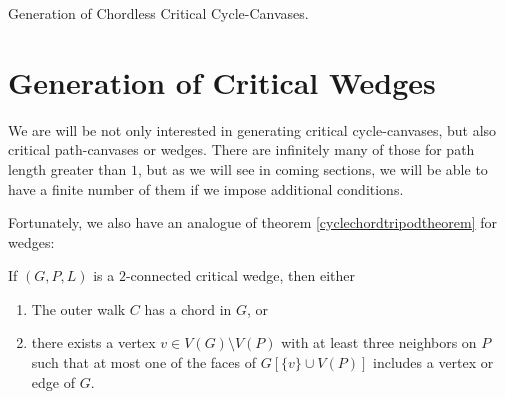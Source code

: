 \begin{algorithm}[H]
\caption{Generation of Chordless Critical Cycle-Canvases.}
\SetAlgoLined
{}



\end{algorithm}


\section{Generation of Critical Wedges}
\label{sec:generationwedges}

We are will be not only interested in generating critical cycle-canvases, but also critical path-canvases or wedges. 
There are infinitely many of those for path length greater than $1$, but as we will see in coming sections, 
we will be able to have a finite number of them if we impose additional conditions. 

Fortunately, we also have an analogue of theorem \ref{cyclechordtripodtheorem} for wedges:

\begin{theorem}
If $(G, P, L)$ is a $2$-connected critical wedge, then either

\begin{enumerate}
\item The outer walk $C$ has a chord in $G$, or
\item there exists a vertex $v \in V(G) \setminus V(P)$ with at least three neighbors on $P$ such that at most one of the faces of 
$G[\{v\} \cup V(P)]$ includes a vertex or edge of $G$. 
\end{enumerate}
\end{theorem}

